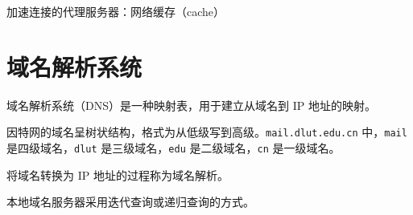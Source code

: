 \documentclass[UTF8]{ctexart}
\begin{document}
加速连接的代理服务器：网络缓存（cache）

\section{域名解析系统}
域名解析系统（DNS）是一种映射表，用于建立从域名到 IP 地址的映射。

因特网的域名呈树状结构，格式为从低级写到高级。\verb!mail.dlut.edu.cn! 中，\verb!mail! 是四级域名，\verb!dlut! 是三级域名，\verb!edu! 是二级域名，\verb!cn! 是一级域名。

将域名转换为 IP 地址的过程称为域名解析。

本地域名服务器采用迭代查询或递归查询的方式。

\newpage
{}
\BgThispage
\vspace{0pt}
\end{document}
